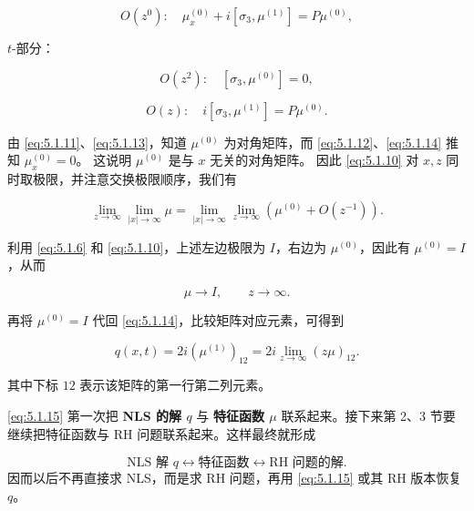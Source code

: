 \documentclass[
    lang=cn,
    scheme=chinese,
    mode=simple,
    device=normal,
    color=blue,
    math=cm,
    thmcnt=section,
    12pt
]{elegantbook}
\begin{document}
\begin{equation}
    O(z^0):\quad\mu_x^{(0)}+i[\sigma_3,\mu^{(1)}]=P\mu^{(0)},
    \tag{5.1.12}
    \label{eq:5.1.12}
\end{equation}

$t$-部分：

\begin{equation}
    O(z^2):\quad[\sigma_3,\mu^{(0)}]=0,
    \tag{5.1.13}
    \label{eq:5.1.13}
\end{equation}

\begin{equation}
    O(z):\quad i[\sigma_3,\mu^{(1)}]=P\mu^{(0)}.
    \tag{5.1.14}
    \label{eq:5.1.14}
\end{equation}

由 \eqref{eq:5.1.11}、\eqref{eq:5.1.13}，知道 $\mu^{(0)}$ 为对角矩阵，而 \eqref{eq:5.1.12}、\eqref{eq:5.1.14} 推知 $\mu_x^{(0)}=0$。
这说明 $\mu^{(0)}$ 是与 $x$ 无关的对角矩阵。
因此 \eqref{eq:5.1.10} 对 $x,z$ 同时取极限，并注意交换极限顺序，我们有

\[
    \lim\limits_{z\to\infty}\lim\limits_{\lvert x\rvert\to\infty}\mu
    =
    \lim\limits_{\lvert x\rvert\to\infty}\lim\limits_{z\to\infty}\left(\mu^{(0)}+O(z^{-1})\right).
\]

利用 \eqref{eq:5.1.6} 和 \eqref{eq:5.1.10}，上述左边极限为 $I$，右边为 $\mu^{(0)}$，因此有 $\mu^{(0)}=I$，从而

\[
    \mu\to I,\qquad z\to\infty.
\]

再将 $\mu^{(0)}=I$ 代回 \eqref{eq:5.1.14}，比较矩阵对应元素，可得到

\begin{equation}
    q(x,t)
    =
    2i(\mu^{(1)})_{12}
    =
    2i\lim\limits_{z\to\infty}(z\mu)_{12}.
    \tag{5.1.15}
    \label{eq:5.1.15}
\end{equation}

其中下标 $12$ 表示该矩阵的第一行第二列元素。

\begin{callout}
    \eqref{eq:5.1.15} 第一次把 \textbf{NLS 的解 $q$} 与 \textbf{特征函数 $\mu$} 联系起来。接下来第 2、3 节要继续把特征函数与 RH 问题联系起来。这样最终就形成

    \[
        \text{NLS 解 }q
        \longleftrightarrow
        \text{特征函数}
        \longleftrightarrow
        \text{RH 问题的解}.
    \]
    因而以后不再直接求 NLS，而是求 RH 问题，再用 \eqref{eq:5.1.15} 或其 RH 版本恢复 $q$。
\end{callout}
\end{document}

